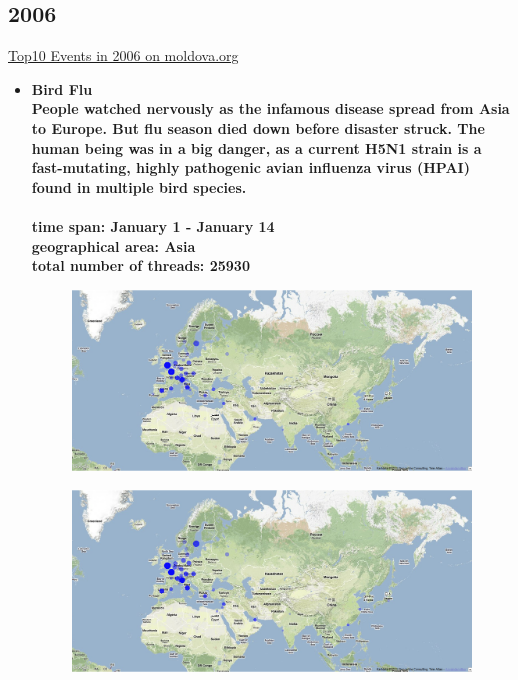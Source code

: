 \documentclass[11pt,a4paper,english]{article}
\begin{document}
			\subsection{2006}
			\href{http://social.moldova.org/news/10-most-important-world-events-of-2006-217385-eng.html}{Top10 Events in 2006 on moldova.org}
				\begin{itemize}
					\item \bf Bird Flu \rm
						\\ People watched nervously as the infamous disease spread from Asia to Europe. But flu season died down before disaster struck. The human being was in a big danger, as a current H5N1 strain is a fast-mutating, highly pathogenic avian influenza virus (HPAI) found in multiple bird species.
						\\\\ \bf time span: \rm January 1 - January 14
						\\ \bf geographical area: \rm Asia
						\\ \bf total number of threads: \rm 25930
						\begin{figure}[H]
							\vspace{-5pt}
  							\begin{center}
								\includegraphics[width=130mm]{img/pre-birdflu}
							\end{center}
							\vspace{-13pt}
						\end{figure}
						\begin{figure}[H]
							\vspace{-13pt}
	  						\begin{center}
								\includegraphics[width=130mm]{img/post-birdflu}
							\end{center}
							\vspace{-5pt}
						\end{figure}
						

\end{itemize}
\end{document}
